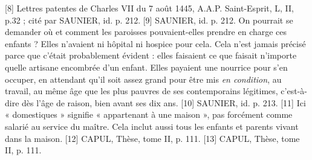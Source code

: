 [8] Lettres patentes de Charles VII du 7 août 1445, A.A.P. Saint-Esprit, L, II, p.32 ; cité par SAUNIER, id. p. 212.
[9] SAUNIER, id. p. 212. On pourrait se demander où et comment les paroisses pouvaient-elles prendre en charge ces enfants ? Elles n'avaient ni hôpital ni hospice pour cela. Cela n'est jamais précisé parce que c'était probablement évident : elles faisaient ce que faisait n'importe quelle artisane encombrée d'un enfant. Elles payaient une nourrice pour s'en occuper, en attendant qu'il soit assez grand pour être mis \emph{en condition}, au travail, au même âge que les plus pauvres de ses contemporains légitimes, c'est-à-dire dès l'âge de raison, bien avant ses dix ans.
[10] SAUNIER, id. p. 213.
[11] Ici « domestiques » signifie « appartenant à une maison », pas forcément comme salarié au service du maître. Cela inclut aussi tous les enfants et parents vivant dans la maison.
[12] CAPUL, Thèse, tome II, p. 111.
[13] CAPUL, Thèse, tome II, p. 111.